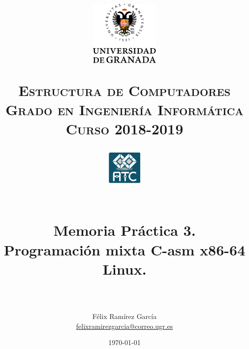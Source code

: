 
\usepackage{url}

\title{	
	\normalfont \normalsize
	\begin{figure}[htb]
		\centering
		\includegraphics[width=0.3\textwidth]{./imagenes/1}
	\end{figure}
	\textsc{\textbf{Estructura de Computadores} \\ Grado en Ingeniería Informática \\ 
	Curso 2018-2019} \\ [25pt] %
	\begin{figure}[htb]
		\centering
		\includegraphics[width=0.15\textwidth]{./imagenes/2}
	\end{figure}
	\horrule{0.5pt} \\[0.4cm] %
	\huge Memoria Práctica 3. \\
	\huge Programaci\'on mixta C-asm x86-64 Linux.
	\\ %
	\horrule{2pt} \\[0.5cm] %
}
\author{Félix Ramírez García  \\
\href{mailto:felixramirezgarcia@correo.ugr.es}{felixramirezgarcia@correo.ugr.es}} %
\date{\normalsize\today} %



	
	\maketitle %
	
	\newpage %
	
